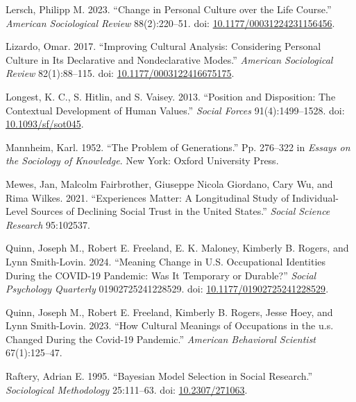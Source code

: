 \documentclass[
  11pt,
]{article}
\newlength{\cslhangindent}
\newenvironment{CSLReferences}[2] %
 {\begin{list}{}{%
  \setlength{\itemindent}{0pt}
  \setlength{\leftmargin}{0pt}
  \setlength{\parsep}{0pt}
  \ifodd #1
   \setlength{\leftmargin}{\cslhangindent}
   \setlength{\itemindent}{-1\cslhangindent}
  \fi
  \setlength{\itemsep}{#2\baselineskip}}}
 {\end{list}}
\begin{document}
\begin{CSLReferences}{1}{1}
Lersch, Philipp M. 2023. {``Change in {Personal} {Culture} over the
{Life} {Course}.''} \emph{American Sociological Review} 88(2):220--51.
doi:
\href{https://doi.org/10.1177/00031224231156456}{10.1177/00031224231156456}.

Lizardo, Omar. 2017. {``Improving {Cultural} {Analysis}: {Considering}
{Personal} {Culture} in Its {Declarative} and {Nondeclarative}
{Modes}.''} \emph{American Sociological Review} 82(1):88--115. doi:
\href{https://doi.org/10.1177/0003122416675175}{10.1177/0003122416675175}.

Longest, K. C., S. Hitlin, and S. Vaisey. 2013. {``Position and
{Disposition}: {The} {Contextual} {Development} of {Human} {Values}.''}
\emph{Social Forces} 91(4):1499--1528. doi:
\href{https://doi.org/10.1093/sf/sot045}{10.1093/sf/sot045}.

Mannheim, Karl. 1952. {``The {Problem} of {Generations}.''} Pp. 276--322
in \emph{Essays on the {Sociology} of {Knowledge}}. New York: Oxford
University Press.

Mewes, Jan, Malcolm Fairbrother, Giuseppe Nicola Giordano, Cary Wu, and
Rima Wilkes. 2021. {``Experiences Matter: A Longitudinal Study of
Individual-Level Sources of Declining Social Trust in the United
States.''} \emph{Social Science Research} 95:102537.

Quinn, Joseph M., Robert E. Freeland, E. K. Maloney, Kimberly B. Rogers,
and Lynn Smith-Lovin. 2024. {``Meaning {Change} in {U}.{S}.
{Occupational} {Identities} During the {COVID}-19 {Pandemic}: {Was} {It}
{Temporary} or {Durable}?''} \emph{Social Psychology Quarterly}
01902725241228529. doi:
\href{https://doi.org/10.1177/01902725241228529}{10.1177/01902725241228529}.

Quinn, Joseph M., Robert E. Freeland, Kimberly B. Rogers, Jesse Hoey,
and Lynn Smith-Lovin. 2023. {``How Cultural Meanings of Occupations in
the u.s. Changed During the Covid-19 Pandemic.''} \emph{American
Behavioral Scientist} 67(1):125--47.

Raftery, Adrian E. 1995. {``Bayesian {Model} {Selection} in {Social}
{Research}.''} \emph{Sociological Methodology} 25:111--63. doi:
\href{https://doi.org/10.2307/271063}{10.2307/271063}.


\end{CSLReferences}
\end{document}
